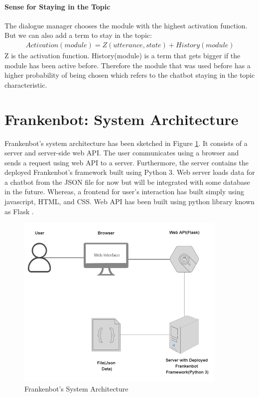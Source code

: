 \paragraph*{Sense for Staying in the Topic}
The dialogue manager chooses the module with the highest activation function. But we can also add a term to stay in the topic: 
\begin{align*}
 Activation(module) = Z(utterance, state) + History(module)
\end{align*} 
Z is the activation function. History(module) is a term that gets bigger if the module has been active before. Therefore the module that was used before has a higher probability of being chosen which refers to the chatbot staying in the topic characteristic.

\section{Frankenbot: System Architecture}
Frankenbot’s system architecture has been sketched in Figure \ref{fig:sysArch}. It consists of a server and server-side web API. The user communicates using a browser and sends a request using web API to a server. Furthermore, the server contains the deployed Frankenbot's framework built using Python 3. Web server loads data for a chatbot from the JSON file for now but will be integrated with some database in the future. Whereas, a frontend for user's interaction has built simply using javascript, HTML, and CSS. Web API has been built using python library known as Flask \cite{flask}. 

\begin{figure}[!h]
    \centering
    \includegraphics[width=0.9\textwidth]{img/System_Architecture_Updated.PNG}
    \caption{Frankenbot's System Architecture}
    \label{fig:sysArch}
\end{figure} 

